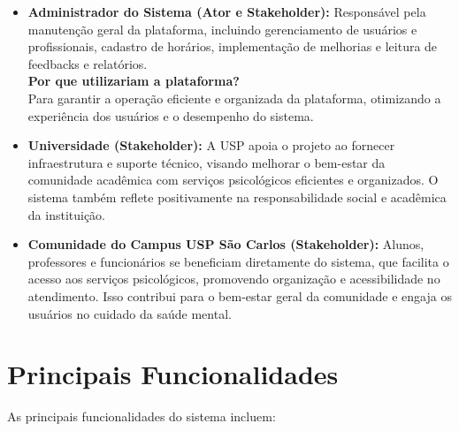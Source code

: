 \documentclass[a4paper,12pt]{report}
\begin{document}
\begin{itemize}
    \item \textbf{Administrador do Sistema (Ator e Stakeholder):}
    Responsável pela manutenção geral da plataforma, incluindo gerenciamento de usuários e profissionais, cadastro de horários, implementação de melhorias e leitura de feedbacks e relatórios.\\

    \textbf{Por que utilizariam a plataforma?}\\
    Para garantir a operação eficiente e organizada da plataforma, otimizando a experiência dos usuários e o desempenho do sistema.\\

    \item \textbf{Universidade (Stakeholder):}
    A USP apoia o projeto ao fornecer infraestrutura e suporte técnico, visando melhorar o bem-estar da comunidade acadêmica com serviços psicológicos eficientes e organizados. O sistema também reflete positivamente na responsabilidade social e acadêmica da instituição.

    \item \textbf{Comunidade do Campus USP São Carlos (Stakeholder):}
    Alunos, professores e funcionários se beneficiam diretamente do sistema, que facilita o acesso aos serviços psicológicos, promovendo organização e acessibilidade no atendimento. Isso contribui para o bem-estar geral da comunidade e engaja os usuários no cuidado da saúde mental.
    
\end{itemize}


\section{Principais Funcionalidades}
As principais funcionalidades do sistema incluem:
\end{document}
